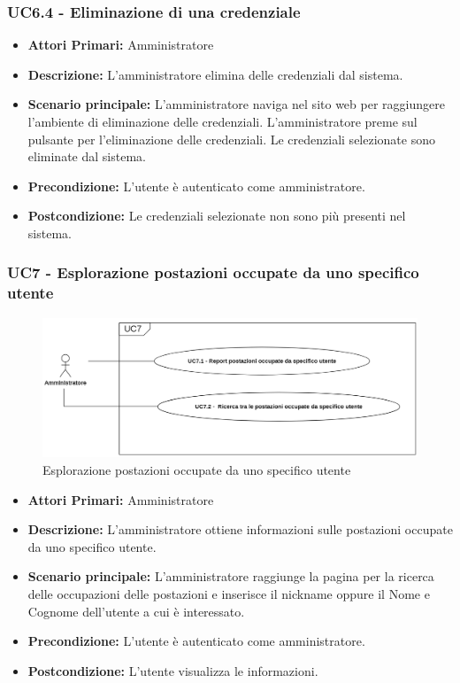 \subsubsection{ UC6.4 - Eliminazione di una credenziale}
\begin{itemize}
	\item\textbf{Attori Primari:} 
	Amministratore
	\item\textbf{Descrizione:} 
	L'amministratore elimina delle credenziali dal sistema.
	\item\textbf{Scenario principale:} 
	L'amministratore naviga nel sito web per raggiungere l'ambiente di eliminazione delle credenziali.
	L'amministratore preme sul pulsante per l'eliminazione delle credenziali.
	Le credenziali selezionate sono eliminate dal sistema.
	\item\textbf{Precondizione:} 
	L'utente è autenticato come amministratore.
	\item\textbf{Postcondizione:}
	Le credenziali selezionate non sono più presenti nel sistema.
\end{itemize}

\subsubsection{ UC7 - Esplorazione postazioni occupate da uno specifico utente}
\begin{figure}[H]
	\centering
	\includegraphics[width=15cm]{res/images/UC7.png}
	\caption{Esplorazione postazioni occupate da uno specifico utente}
	\label{fig:Esplorazione postazioni occupate da uno specifico utente}
\end{figure}
\begin{itemize}
	\item\textbf{Attori Primari:} 
	Amministratore
	\item\textbf{Descrizione:} 
	L'amministratore ottiene informazioni sulle postazioni occupate da uno specifico utente.
	\item\textbf{Scenario principale:} 
	L'amministratore raggiunge la pagina per la ricerca delle occupazioni delle postazioni e inserisce il nickname oppure il Nome e Cognome dell'utente a cui è interessato.
	\item\textbf{Precondizione:} 
	L'utente è autenticato come amministratore.
	\item\textbf{Postcondizione:}
	L'utente visualizza le informazioni.
\end{itemize}

